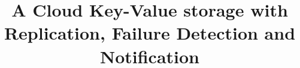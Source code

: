 \documentclass{sig-alternate}
\begin{document}
%
\title{A Cloud Key-Value storage with Replication, Failure Detection and Notification}%
%
%
%
%
%
\end{document}
